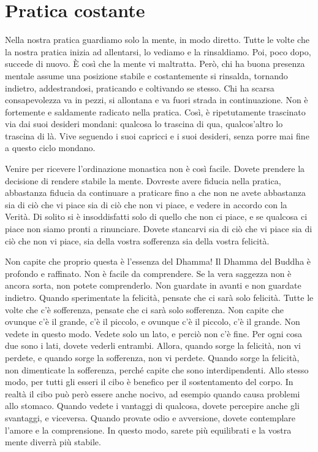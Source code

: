 \section{Pratica costante}

Nella nostra pratica guardiamo solo la mente, in modo diretto. Tutte le
volte che la nostra pratica inizia ad allentarsi, lo vediamo e la
rinsaldiamo. Poi, poco dopo, succede di nuovo. È così che la mente vi
maltratta. Però, chi ha buona presenza mentale assume una posizione
stabile e costantemente si rinsalda, tornando indietro, addestrandosi,
praticando e coltivando se stesso. Chi ha scarsa consapevolezza va in
pezzi, si allontana e va fuori strada in continuazione. Non è fortemente
e saldamente radicato nella pratica. Così, è ripetutamente trascinato
via dai suoi desideri mondani: qualcosa lo trascina di qua,
qualcos'altro lo trascina di là. Vive seguendo i suoi capricci e i suoi
desideri, senza porre mai fine a questo ciclo mondano.

Venire per ricevere l'ordinazione monastica non è così facile. Dovete
prendere la decisione di rendere stabile la mente. Dovreste avere
fiducia nella pratica, abbastanza fiducia da continuare a praticare fino
a che non ne avete abbastanza sia di ciò che vi piace sia di ciò che non
vi piace, e vedere in accordo con la Verità. Di solito si è
insoddisfatti solo di quello che non ci piace, e se qualcosa ci piace
non siamo pronti a rinunciare. Dovete stancarvi sia di ciò che vi piace
sia di ciò che non vi piace, sia della vostra sofferenza sia della
vostra felicità.

Non capite che proprio questa è l'essenza del Dhamma! Il Dhamma del
Buddha è profondo e raffinato. Non è facile da comprendere. Se la vera
saggezza non è ancora sorta, non potete comprenderlo. Non guardate in
avanti e non guardate indietro. Quando sperimentate la felicità, pensate
che ci sarà solo felicità. Tutte le volte che c'è sofferenza, pensate
che ci sarà solo sofferenza. Non capite che ovunque c'è il grande, c'è
il piccolo, e ovunque c'è il piccolo, c'è il grande. Non vedete in
questo modo. Vedete solo un lato, e perciò non c'è fine. Per ogni cosa
due sono i lati, dovete vederli entrambi. Allora, quando sorge la
felicità, non vi perdete, e quando sorge la sofferenza, non vi perdete.
Quando sorge la felicità, non dimenticate la sofferenza, perché capite
che sono interdipendenti. Allo stesso modo, per tutti gli esseri il cibo
è benefico per il sostentamento del corpo. In realtà il cibo può però
essere anche nocivo, ad esempio quando causa problemi allo stomaco.
Quando vedete i vantaggi di qualcosa, dovete percepire anche gli
svantaggi, e viceversa. Quando provate odio e avversione, dovete
contemplare l'amore e la comprensione. In questo modo, sarete più
equilibrati e la vostra mente diverrà più stabile.

